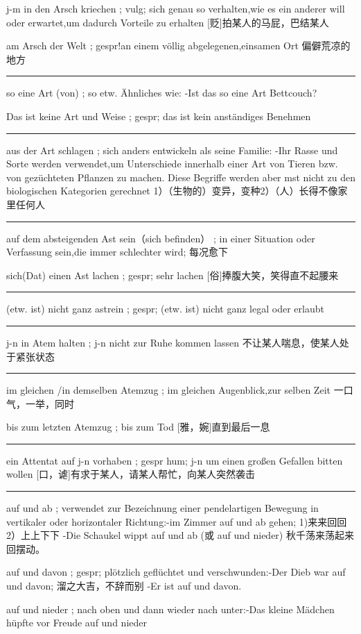 j-m in den Arsch kriechen ; vulg; sich genau so verhalten,wie es ein anderer will oder erwartet,um dadurch Vorteile zu erhalten
[贬]拍某人的马屁，巴结某人

am Arsch der Welt ; gespr!an einem völlig abgelegenen,einsamen Ort
偏僻荒凉的地方

\noindent\rule{\textwidth}{1pt}  
so eine Art (von) ; so etw. Ähnliches wie: -Ist das so eine Art Bettcouch?

Das ist keine Art und Weise ; gespr; das ist kein anständiges Benehmen

\noindent\rule{\textwidth}{1pt}  
aus der Art schlagen ; sich anders entwickeln als seine Familie: -Ihr Rasse und Sorte werden verwendet,um Unterschiede innerhalb einer Art von Tieren bzw. von gezüchteten Pflanzen zu machen. Diese Begriffe werden aber mst nicht zu den biologischen Kategorien gerechnet
1）（生物的）变异，变种2）（人）长得不像家里任何人

\noindent\rule{\textwidth}{1pt}  
auf dem absteigenden Ast sein（sich befinden） ; in einer Situation oder Verfassung sein,die immer schlechter wird;
每况愈下

sich(Dat) einen Ast lachen ; gespr; sehr lachen
[俗]捧腹大笑，笑得直不起腰来

\noindent\rule{\textwidth}{1pt}  
(etw. ist) nicht ganz astrein ; gespr; (etw. ist) nicht ganz legal oder erlaubt

\noindent\rule{\textwidth}{1pt}  
j-n in Atem halten ; j-n nicht zur Ruhe kommen lassen
不让某人喘息，使某人处于紧张状态

\noindent\rule{\textwidth}{1pt}  
im gleichen /in demselben Atemzug ; im gleichen Augenblick,zur selben Zeit
一口气，一举，同时

bis zum letzten Atemzug ; bis zum Tod
[雅，婉]直到最后一息

\noindent\rule{\textwidth}{1pt}  
ein Attentat auf j-n vorhaben ; gespr hum; j-n um einen großen Gefallen bitten wollen
[口，谑]有求于某人，请某人帮忙，向某人突然袭击

\noindent\rule{\textwidth}{1pt}  
auf und ab ; verwendet zur Bezeichnung einer pendelartigen Bewegung in vertikaler oder horizontaler Richtung:-im Zimmer auf und ab gehen;
1)来来回回2）上上下下
-Die Schaukel wippt auf und ab (或 auf und nieder)
秋千荡来荡起来回摆动。

auf und davon ; gespr; plötzlich geflüchtet und verschwunden:-Der Dieb war auf und davon;
溜之大吉，不辞而别
-Er ist auf und davon.

auf und nieder ; nach oben und dann wieder nach unter:-Das kleine Mädchen hüpfte vor Freude auf und nieder

